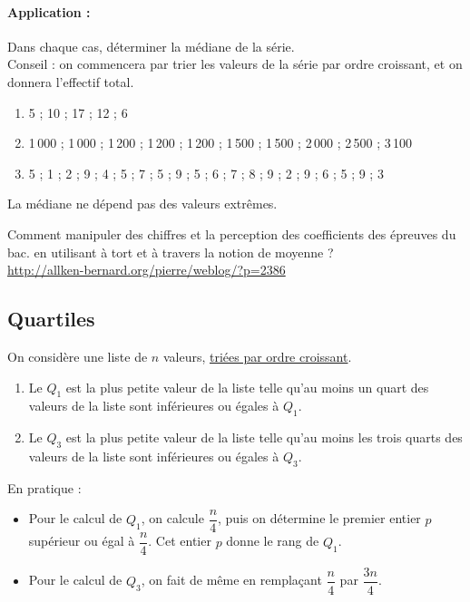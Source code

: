 \paragraph{Application :}Dans chaque cas, déterminer la médiane de la
  série.\\
  Conseil : on commencera par trier les valeurs de la série par ordre
  croissant, et on donnera l'effectif total.


\begin{enumerate}
\item 5 ; 10 ; 17 ; 12 ; 6 
\item 1\,000 ; 1\,000 ; 1\,200 ; 1\,200 ; 1\,200 ; 1\,500 ; 1\,500 ;
  2\,000 ; 2\,500 ; 3\,100 
\item 5 ; 1 ; 2 ; 9 ; 4 ; 5 ; 7 ; 5 ; 9 ; 5 ; 6 ; 7 ; 8 ; 9 ; 2 ; 9 ;
  6 ; 5 ; 9 ; 3 
\end{enumerate}

\begin{remark}
La médiane ne dépend pas des valeurs extrêmes.
\end{remark}

\begin{example}
    Comment manipuler des chiffres et la perception des coefficients des épreuves du bac. en utilisant à tort et à travers la notion de moyenne ?\\
    \url{http://allken-bernard.org/pierre/weblog/?p=2386}
\end{example}

\subsection{Quartiles}

\begin{definition}
  On considère une liste de $n$ valeurs, \underline{triées par ordre
    croissant}. 
  \begin{enumerate}
      \item Le  $Q_1$ est la plus petite valeur de
    la liste telle qu'au moins un quart des valeurs de la liste sont
    inférieures ou égales à $Q_1$.
\item Le  $Q_3$ est la plus petite valeur de
    la liste telle qu'au moins les trois quarts des valeurs de la
    liste sont inférieures ou égales à $Q_3$.
  \end{enumerate}

    
\end{definition}


En pratique :
\begin{itemize}
    \item 
  Pour le calcul de $Q_1$, on calcule $\dfrac{n}4$, puis on détermine
  le premier entier $p$ supérieur ou égal à $\dfrac{n}4$. Cet entier
  $p$ donne le rang de $Q_1$. 
  \item
  Pour le calcul de $Q_3$, on fait de même en remplaçant $\dfrac{n}4$
  par $\dfrac{3n}4$. 
\end{itemize}

